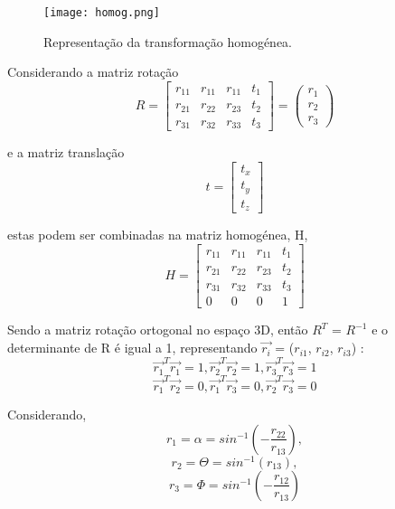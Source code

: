 \begin{figure}[h!] %
	\begin{center}
		\leavevmode		
		\texttt{[image: homog.png]}
		\caption{Representação da transformação homogénea.}
		\label{fig:homog}
	\end{center}
\end{figure}

\vspace{5mm}  %

Considerando a matriz rotação \[  R = \left[ \begin{array}{cccc}
r_{11} & r_{11} & r_{11} & t_1 \\ 
r_{21} & r_{22} & r_{23} & t_2 \\ 
r_{31} & r_{32} & r_{33} & t_3 
\end{array} \right] = \left(\begin{array}{ccc}
r_1 \\ r_2 \\ r_3
\end{array}\right)\]

e a matriz translação \[ t = \left[ \begin{array}{ccc}
t_x \\ t_y \\ t_z
\end{array}\right]\]

estas podem ser combinadas na matriz homogénea, H, \[ H = \left[ \begin{array}{cccc}
r_{11} & r_{11} & r_{11} & t_1 \\ 
r_{21} & r_{22} & r_{23} & t_2 \\ 
r_{31} & r_{32} & r_{33} & t_3 \\ 
0 & 0 & 0 & 1
\end{array} \right] \] 

Sendo a matriz rotação ortogonal no espaço 3D, então $R^{T}$ = $R^{-1}$ e o determinante de R é igual a 1, representando $\overrightarrow{r_i}$ = ($r_{i1}$, $r_{i2}$, $r_{i3}$) :\[
\overrightarrow{r_1}^T \overrightarrow{r_1} = 1,  \overrightarrow{r_2}^T \overrightarrow{r_2} = 1, \overrightarrow{r_3}^T \overrightarrow{r_3} = 1  \]
\[ \overrightarrow{r_1}^T \overrightarrow{r_2} = 0,  \overrightarrow{r_1}^T \overrightarrow{r_3} = 0, \overrightarrow{r_2}^T \overrightarrow{r_3} = 0 \]

Considerando, \[ r_1 = \alpha = sin^{-1}(-\frac{r_{22}}{r_{13}}), \] \[ r_2 = \Theta = sin^{-1}(r_{13}), \] \[ r_3 = \Phi = sin^{-1}(-\frac{r_{12}}{r_{13}}) \] 

